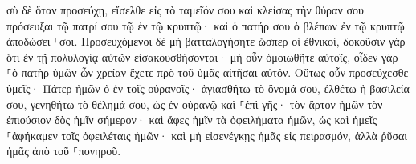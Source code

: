 \documentclass{openreader}
\begin{document}
σὺ δὲ ὅταν προσεύχῃ, εἴσελθε εἰς τὸ ταμεῖόν σου καὶ κλείσας τὴν θύραν σου πρόσευξαι τῷ πατρί σου τῷ ἐν τῷ κρυπτῷ· καὶ ὁ πατήρ σου ὁ βλέπων ἐν τῷ κρυπτῷ ἀποδώσει ⸀σοι. 
Προσευχόμενοι δὲ μὴ βατταλογήσητε ὥσπερ οἱ ἐθνικοί, δοκοῦσιν γὰρ ὅτι ἐν τῇ πολυλογίᾳ αὐτῶν εἰσακουσθήσονται· 
μὴ οὖν ὁμοιωθῆτε αὐτοῖς, οἶδεν γὰρ ⸀ὁ πατὴρ ὑμῶν ὧν χρείαν ἔχετε πρὸ τοῦ ὑμᾶς αἰτῆσαι αὐτόν. 
Οὕτως οὖν προσεύχεσθε ὑμεῖς· Πάτερ ἡμῶν ὁ ἐν τοῖς οὐρανοῖς· ἁγιασθήτω τὸ ὄνομά σου, 
ἐλθέτω ἡ βασιλεία σου, γενηθήτω τὸ θέλημά σου, ὡς ἐν οὐρανῷ καὶ ⸀ἐπὶ γῆς· 
τὸν ἄρτον ἡμῶν τὸν ἐπιούσιον δὸς ἡμῖν σήμερον· 
καὶ ἄφες ἡμῖν τὰ ὀφειλήματα ἡμῶν, ὡς καὶ ἡμεῖς ⸀ἀφήκαμεν τοῖς ὀφειλέταις ἡμῶν· 
καὶ μὴ εἰσενέγκῃς ἡμᾶς εἰς πειρασμόν, ἀλλὰ ῥῦσαι ἡμᾶς ἀπὸ τοῦ ⸀πονηροῦ. 
\end{document}
